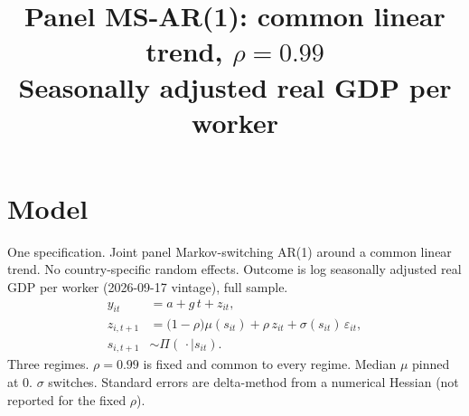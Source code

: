 \documentclass[11pt]{article}
\title{Panel MS-AR(1): common linear trend, $\rho=0.99$\\[0.4em]\large Seasonally adjusted real GDP per worker}
\author{}
\date{}
\begin{document}
\maketitle
\section{Model}
One specification. Joint panel Markov-switching AR(1) around a common linear trend. No country-specific random effects. Outcome is log seasonally adjusted real GDP per worker (2026-09-17 vintage), full sample.
\begin{align}
y_{it} &= a + g\, t + z_{it}, \\
z_{i,t+1} &= \bigl(1-\rho\bigr)\mu(s_{it}) + \rho\, z_{it} + \sigma(s_{it})\,\varepsilon_{it}, \\
s_{i,t+1} &\sim \Pi(\,\cdot\mid s_{it}).
\end{align}
Three regimes. $\rho=0.99$ is fixed and common to every regime. Median $\mu$ pinned at 0. $\sigma$ switches. Standard errors are delta-method from a numerical Hessian (not reported for the fixed $\rho$).
\clearpage
\end{document}
